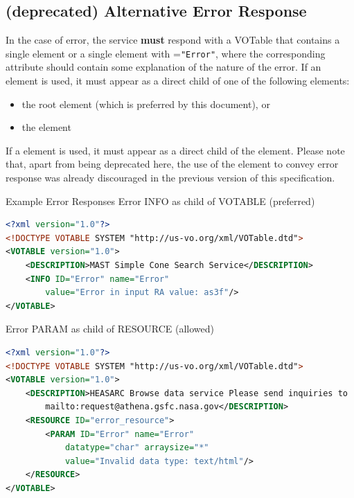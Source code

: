 \documentclass[11pt,a4paper]{ivoa} 
\begin{document}
\subsection{(\textbf{deprecated}) Alternative Error Response}
\label{subsec:err103} In the case of error, the service \textbf{must}
respond with a VOTable that contains a single  element or a
single  element with =\texttt{"Error"}, where
the corresponding  attribute should contain some
explanation of the nature of the error. If an  element is
used, it must appear as a direct child of one of the following elements:
\begin{itemize} \item the root  element (which is
preferred by this document), or \item the  element
\end{itemize}

If a  element is used, it must appear as a direct child of
the  element.
Please note
that, apart from being deprecated here, the use of the 
element to convey error response was already discouraged in the previous
version of this specification.

\begin{bigdescription} 
	\item[Example Error Responses] Error INFO as child of VOTABLE (preferred)\\

\begin{lstlisting}[language=XML,basicstyle=\footnotesize]
<?xml version="1.0"?>
<!DOCTYPE VOTABLE SYSTEM "http://us-vo.org/xml/VOTable.dtd">
<VOTABLE version="1.0">
	<DESCRIPTION>MAST Simple Cone Search Service</DESCRIPTION>
	<INFO ID="Error" name="Error"
		value="Error in input RA value: as3f"/>
</VOTABLE> 
\end{lstlisting} 

Error PARAM as child of RESOURCE (allowed)

\begin{lstlisting}[language=XML,basicstyle=\footnotesize]
<?xml version="1.0"?>
<!DOCTYPE VOTABLE SYSTEM "http://us-vo.org/xml/VOTable.dtd">
<VOTABLE version="1.0">
	<DESCRIPTION>HEASARC Browse data service Please send inquiries to
		mailto:request@athena.gsfc.nasa.gov</DESCRIPTION>
	<RESOURCE ID="error_resource">
		<PARAM ID="Error" name="Error" 
			datatype="char" arraysize="*" 
			value="Invalid data type: text/html"/>
	</RESOURCE>
</VOTABLE>
\end{lstlisting}

\end{bigdescription}
\end{document}
